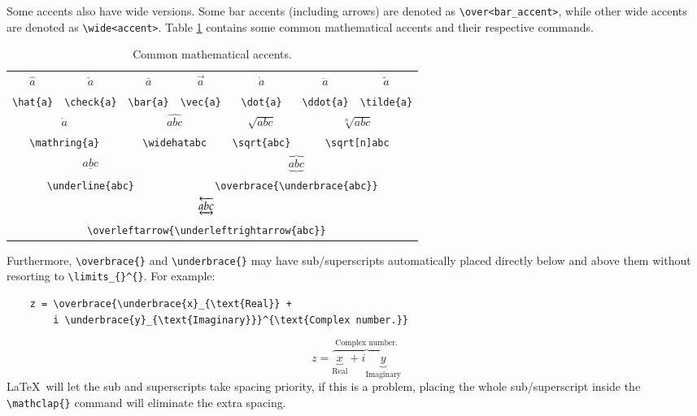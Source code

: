 Some accents also have wide versions.  Some bar accents (including
arrows) are denoted as \verb|\over<bar_accent>|, while other wide
accents are denoted as \verb|\wide<accent>|.  Table \ref{t:ma}
contains some common mathematical accents and their respective
commands.
\begin{table}[!htbp]
    \centering
    \caption{Common mathematical accents.}
    \label{t:ma}
    \begin{tabular}{ccccccc}
        $\hat{a}$ & $\check{a}$ & $\bar{a}$ & $\vec{a}$ & $\dot{a}$ & $\ddot{a}$ & $\tilde{a}$ \\
        \verb|\hat{a}| & \verb|\check{a}| & \verb|\bar{a}| & \verb|\vec{a}| & \verb|\dot{a}| & \verb|\ddot{a}| & \verb|\tilde{a}| \\
        \multicolumn{2}{c}{$\mathring{a}$} & \multicolumn{2}{c}{$\widehat{abc}$} & $\sqrt{abc}$ & \multicolumn{2}{c}{$\sqrt[n]{abc}$} \\
        \multicolumn{2}{c}{\texttt{\textbackslash mathring\{a\}}} & \multicolumn{2}{c}{\texttt{\textbackslash widehat{abc}}} & \verb|\sqrt{abc}| & \multicolumn{2}{c}{\texttt{\textbackslash sqrt[n]{abc}}} \\
        \multicolumn{3}{c}{$\underline{abc}$} & \multicolumn{4}{c}{$\overbrace{\underbrace{abc}}$} \\
        \multicolumn{3}{c}{\texttt{\textbackslash underline\{abc\}}} & \multicolumn{4}{c}{\texttt{\textbackslash overbrace\{\textbackslash underbrace\{abc\}\}}} \\
        & \multicolumn{5}{c}{$\overleftarrow{\underleftrightarrow{abc}}$} & \\
        & \multicolumn{5}{c}{\texttt{\textbackslash overleftarrow\{\textbackslash underleftrightarrow\{abc\}\}}} & \\
    \end{tabular}
\end{table}

Furthermore, \verb|\overbrace{}| and \verb|\underbrace{}| may have
sub/superscripts automatically placed directly below and above them
without resorting to \verb|\limits_{}^{}|.  For example:
\begin{verbatim}
	z = \overbrace{\underbrace{x}_{\text{Real}} +
	    i \underbrace{y}_{\text{Imaginary}}}^{\text{Complex number.}}
\end{verbatim}
\[z = \overbrace{\underbrace{x}_{\text{Real}} + i
    \underbrace{y}_{\text{Imaginary}}}^{\text{Complex number.}}\]
\LaTeX~will let the sub and superscripts take spacing priority, if
this is a problem, placing the whole sub/superscript inside the
\verb|\mathclap{}| command will eliminate the extra spacing.
%
